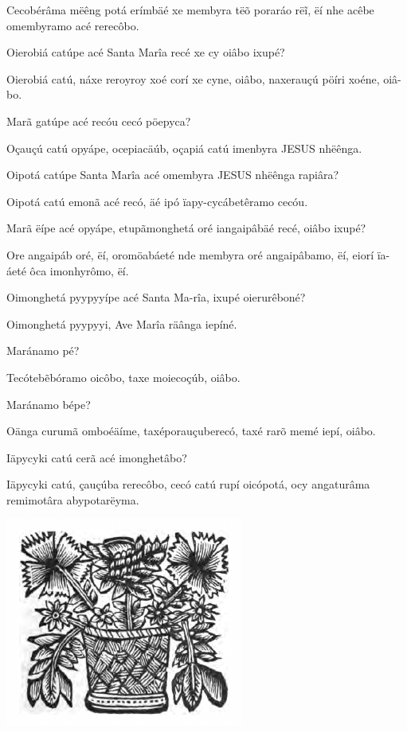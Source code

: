 \documentclass[openany,titlepage,12pt]{book}
\begin{document}
\begin{altereven}
    \item Cecobérâma mëêng potá erímbäé xe\linebreak \newpage
    membyra tëõ poraráo rëĩ, ëí nhe acêbe\linebreak
    omembyramo acé rerecôbo.
    \item Oierobiá catúpe acé Santa Marîa recé xe cy oiâbo ixupé?
    \item Oierobiá catú, náxe reroyroy xoé corí xe cyne,
    oiâbo, naxerauçú pöíri xoéne, oiâ-bo.
    \item Marã gatúpe acé recóu cecó pöepyca?
    \item Oçauçú catú opyápe, ocepiacäúb, oçapiá catú imenbyra
    JESUS nhëênga.
    \item Oipotá catúpe Santa Marîa acé omembyra JESUS nhëênga
    rapiâra?
    \item  Oipotá catú emonã acé recó, äé ipó ïapy-cycábetêramo
    cecóu.
    \item Marã ëípe acé opyápe, etupãmonghetá oré iangaipâbäé
    recé, oiâbo ixupé?
    \item Ore angaipáb oré, ëí, oromöabáeté nde membyra oré
    angaipâbamo, ëí, eiorí ïa-\linebreak áeté ôca imonhyrômo, ëí.
    \item Oimonghetá pyypyyípe acé Santa Ma-rîa, ixupé
    oierurêboné?
    \item Oimonghetá pyypyyi, Ave Marîa räânga iepíné.
    \item Maránamo pé?
    \item Tecótebẽbóramo oicôbo, taxe moiecoçúb, oiâbo.
    \item Maránamo bépe?
    \item Oänga curumã omboéäíme, taxéporauçuberecó, taxé rarõ
    memé iepí, oiâbo.
    \item Iäpycyki catú cerã acé imonghetâbo?
    \item Iäpycyki catú, çauçúba rerecôbo, cecó\linebreak
    catú rupí oicópotá, ocy angaturâma remimotâra abypotarëyma.
\end{altereven}

\begin{center}
    \vspace*{20pt}
    \includegraphics[scale=0.66]{11.livro2_fim.png}
\end{center}
\newpage
\end{document}
